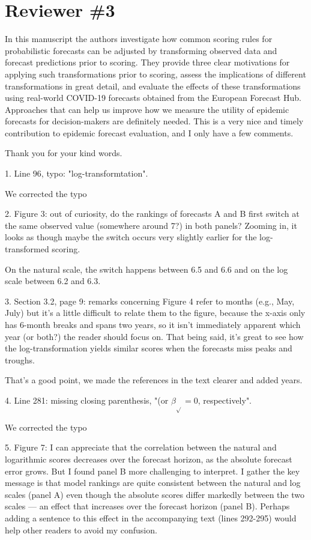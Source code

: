 \documentclass{article}
\newcommand{\black}{\color{black}}
\newcommand{\blue}{\color{blue}}
\begin{document}
\blue
\section{Reviewer \#3}

In this manuscript the authors investigate how common scoring rules for probabilistic forecasts can be adjusted by transforming observed data and forecast predictions prior to scoring. They provide three clear motivations for applying such transformations prior to scoring, assess the implications of different transformations in great detail, and evaluate the effects of these transformations using real-world COVID-19 forecasts obtained from the European Forecast Hub. Approaches that can help us improve how we measure the utility of epidemic forecasts for decision-makers are definitely needed. This is a very nice and timely contribution to epidemic forecast evaluation, and I only have a few comments.

\black
Thank you for your kind words. 

\blue
1. Line 96, typo: "log-transformtation".

\black
We corrected the typo

\blue
2. Figure 3: out of curiosity, do the rankings of forecasts A and B first switch at the same observed value (somewhere around 7?) in both panels? Zooming in, it looks as though maybe the switch occurs very slightly earlier for the log-transformed scoring.

\black
On the natural scale, the switch happens between 6.5 and 6.6 and on the log scale between 6.2 and 6.3. 

\blue
3. Section 3.2, page 9: remarks concerning Figure 4 refer to months (e.g., May, July) but it's a little difficult to relate them to the figure, because the x-axis only has 6-month breaks and spans two years, so it isn't immediately apparent which year (or both?) the reader should focus on. That being said, it's great to see how the log-transformation yields similar scores when the forecasts miss peaks and troughs.

\black
That's a good point, we made the references in the text clearer and added years. 

\blue
4. Line 281: missing closing parenthesis, "(or $\beta_{\sqrt{}} = 0$, respectively".

\black
We corrected the typo

\blue
5. Figure 7: I can appreciate that the correlation between the natural and logarithmic scores decreases over the forecast horizon, as the absolute forecast error grows. But I found panel B more challenging to interpret. I gather the key message is that model rankings are quite consistent between the natural and log scales (panel A) even though the absolute scores differ markedly between the two scales — an effect that increases over the forecast horizon (panel B). Perhaps adding a sentence to this effect in the accompanying text (lines 292-295) would help other readers to avoid my confusion.
\end{document}
